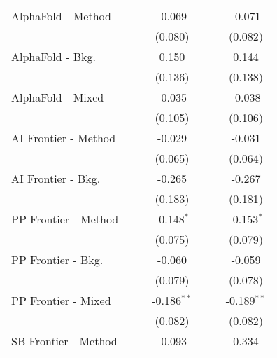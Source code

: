 \begin{tabular}{lcccccc}
   AlphaFold - Method           &               &         & -0.069        &               &             & -0.071\\   
                                &               &         & (0.080)       &               &             & (0.082)\\   
   AlphaFold - Bkg.             &               &         & 0.150         &               &             & 0.144\\   
                                &               &         & (0.136)       &               &             & (0.138)\\   
   AlphaFold - Mixed            &               &         & -0.035        &               &             & -0.038\\   
                                &               &         & (0.105)       &               &             & (0.106)\\   
   AI Frontier - Method         &               &         & -0.029        &               &             & -0.031\\   
                                &               &         & (0.065)       &               &             & (0.064)\\   
   AI Frontier - Bkg.           &               &         & -0.265        &               &             & -0.267\\   
                                &               &         & (0.183)       &               &             & (0.181)\\   
   PP Frontier - Method         &               &         & -0.148$^{*}$  &               &             & -0.153$^{*}$\\   
                                &               &         & (0.075)       &               &             & (0.079)\\   
   PP Frontier - Bkg.           &               &         & -0.060        &               &             & -0.059\\   
                                &               &         & (0.079)       &               &             & (0.078)\\   
   PP Frontier - Mixed          &               &         & -0.186$^{**}$ &               &             & -0.189$^{**}$\\   
                                &               &         & (0.082)       &               &             & (0.082)\\   
   SB Frontier - Method         &               &         & -0.093        &               &             & 0.334\\   

\end{tabular}
